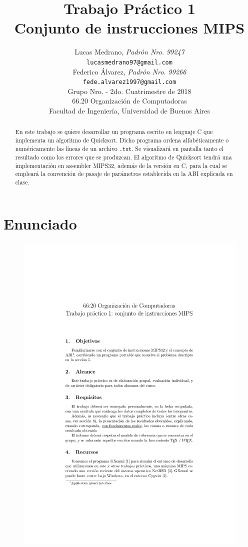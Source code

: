 \documentclass[a4paper, 12pt]{article}
\title{		\textbf{Trabajo Práctico 1}\\
			\textbf{Conjunto de instrucciones MIPS}
			}
\author{	Lucas Medrano, \textit{Padrón Nro. 99247}                     	\\
            \texttt{ lucasmedrano97@gmail.com }                           		\\
            Federico Álvarez, \textit{Padrón Nro. 99266}                 	\\
            \texttt{ fede.alvarez1997@gmail.com }                                 	\\[2.5ex]
            \normalsize{Grupo Nro. \quad - 2do. Cuatrimestre de 2018}      	\\
            \normalsize{66.20 Organización de Computadoras}               	\\
            \normalsize{Facultad de Ingeniería, Universidad de Buenos Aires}\\
       }
\date{}
\begin{document}
	\lstset{inputencoding=utf8/latin1} %
	\maketitle
	\thispagestyle{empty}
	\begin{abstract}
		En este trabajo se quiere desarrollar un programa escrito en lenguaje C que implementa un algoritmo de Quicksort. Dicho programa ordena alfabéticamente o numéricamente las líneas de un archivo \texttt{.txt}. Se visualizará en pantalla tanto el resultado como los errores que se produzcan. El algoritmo de Quicksort tendrá una implementación en assembler MIPS32, además de la versión en C, para la cual se empleará la convención de pasaje de parámetros establecida en la ABI explicada en clase.
	\end{abstract}
	
	\pagebreak
	\thispagestyle{empty}
	\tableofcontents
	\newpage
	
	\setcounter{page}{1}
	
	\section{Enunciado}

	\begin{figure}[H]
		\centering
		\includegraphics[scale=1, page = 1, clip, trim=1.5in 1.5in 20mm 35mm]{files/enunciado.pdf}
	\end{figure}
	
\end{document}
